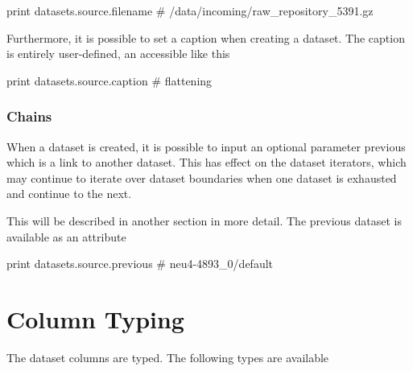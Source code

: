 \begin{python}
print datasets.source.filename
# /data/incoming/raw_repository_5391.gz
\end{python}
Furthermore, it is possible to set a caption when creating a dataset.
The caption is entirely user-defined, an accessible like this

\begin{python}
print datasets.source.caption
# flattening
\end{python}



\subsubsection{Chains}

When a dataset is created, it is possible to input an optional
parameter previous which is a link to another dataset.  This has
effect on the dataset iterators, which may continue to iterate over
dataset boundaries when one dataset is exhausted and continue to the
next.

This will be described in another section in more detail.  The
previous dataset is available as an attribute

\begin{python}
print datasets.source.previous
# neu4-4893_0/default
\end{python}



\newpage
\section{Column Typing}
The dataset columns are typed.  The following types are available

